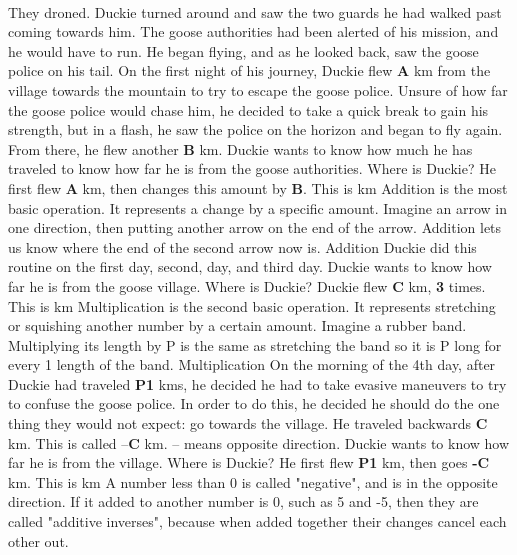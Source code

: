 \documentclass[a4paper,11pt ]{book}
\begin{document}
\paragraph{} They droned. Duckie turned around and saw the two guards he had walked past coming towards him. The goose authorities had been alerted of his mission, and he would have to run. He began flying, and as he looked back, saw the goose police on his tail. 
\vfill
\pagebreak
{On the first night of his journey, Duckie flew \textbf{A} km from the village towards the mountain to try to escape the goose police. Unsure of how far the goose police would chase him, he decided to take a quick break to gain his strength, but in a flash, he saw the police on the horizon and began to fly again. From there, he flew another \textbf{B} km. Duckie wants to know how much he has traveled to know how far he is from the goose authorities. Where is Duckie?}
{He first flew \textbf{A} km, then changes this amount by \textbf{B}. This is  km}
{Addition is the most basic operation. It represents a change by a specific amount. Imagine an arrow in one direction, then putting another arrow on the end of the arrow. Addition lets us know where the end of the second arrow now is.}
{Addition}
{Duckie did this routine on the first day, second, day, and third day.  Duckie wants to know how far he is from the goose village. Where is Duckie?}
{Duckie flew \textbf{C} km, \textbf{3} times. This is  km}
{Multiplication is the second basic operation. It represents stretching or squishing another number by a certain amount. Imagine a rubber band. Multiplying its length by P is the same as stretching the band so it is P long for every 1 length of the band.}
{Multiplication}
{On the morning of the 4th day, after Duckie had traveled \textbf{P1} kms, he decided he had to take evasive maneuvers to try to confuse the goose police. In order to do this, he decided he should do the one thing they would not expect: go towards the village. He traveled backwards \textbf{C} km. This is called –\textbf{C} km. \linebreak – means opposite direction. Duckie wants to know how far he is from the village. Where is Duckie?}
{He first flew \textbf{P1} km, then goes \textbf{-C} km. This is  km}
{A number less than 0 is called "negative", and is in the opposite direction. If it added to another number is 0, such as 5 and -5, then they are called "additive inverses", because when added together their changes cancel each other out.}
\end{document}
